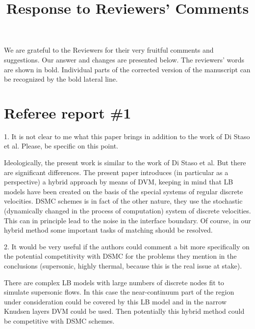 \documentclass{article}
\title{Response to Reviewers' Comments}
\begin{document}
\maketitle

We are grateful to the Reviewers for their very fruitful comments and suggestions.
Our answer and changes are presented below.
The reviewers' words are shown in bold.
Individual parts of the corrected version of the manuscript
can be recognized by the bold lateral line.

\section*{Referee report \#1}

\begin{quoting}
    1. It is not clear to me what this paper brings in addition to the work of Di Staso et al.
    Please, be specific on this point.
\end{quoting}

Ideologically, the present work is similar to the work of Di Staso et al. But there are significant
differences. The present paper introduces (in particular as a perspective) a hybrid approach by
means of DVM, keeping in mind that LB models have been created on the basis of the special
systems of regular discrete velocities. DSMC schemes is in fact of the other nature, they use the
stochastic (dynamically changed in the process of computation) system of discrete velocities.
This can in principle lead to the noise in the interface boundary. Of course, in our hybrid method
some important tasks of matching should be resolved.

\begin{leftbar}
\end{leftbar}

\begin{quoting}
    2. It would be very useful if the authors could comment a bit more specifically
    on the potential competitivity with DSMC for the problems they mention in the conclusions
    (supersonic, highly thermal, because this is the real issue at stake).
\end{quoting}

There are complex LB models with large numbers of discrete nodes fit to simulate supersonic
flows. In this case the near-continuum part of the region under consideration could be covered by
this LB model and in the narrow Knudsen layers DVM could be used. Then potentially this
hybrid method could be competitive with DSMC schemes.
\end{document}
